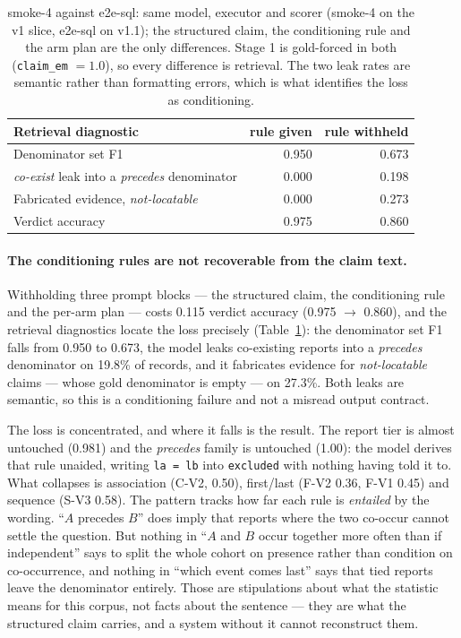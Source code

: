 \begin{table}[t]
\centering
\small
\begin{tabular}{lrr}
\toprule
Retrieval diagnostic & rule given & rule withheld \\
\midrule
Denominator set F1 & 0.950 & 0.673 \\
\emph{co-exist} leak into a \emph{precedes} denominator & 0.000 & 0.198 \\
Fabricated evidence, \emph{not-locatable} & 0.000 & 0.273 \\
\midrule
Verdict accuracy & 0.975 & 0.860 \\
\bottomrule
\end{tabular}
\caption{smoke-4 against e2e-sql: same model, executor and scorer (smoke-4 on the v1 slice, e2e-sql on v1.1); the
structured claim, the conditioning rule and the arm plan are the only
differences. Stage 1 is gold-forced in both (\texttt{claim\_em} $=1.0$), so
every difference is retrieval. The two leak rates are semantic rather than
formatting errors, which is what identifies the loss as conditioning.}
\label{tab:e2econd}
\end{table}

\paragraph{The conditioning rules are not recoverable from the claim text.}
Withholding three prompt blocks --- the structured claim, the conditioning rule
and the per-arm plan --- costs 0.115 verdict accuracy (0.975 $\rightarrow$
0.860), and the retrieval diagnostics locate the loss precisely
(Table~\ref{tab:e2econd}): the denominator set F1 falls from 0.950 to 0.673, the
model leaks co-existing reports into a \emph{precedes} denominator on 19.8\% of
records, and it fabricates evidence for \emph{not-locatable} claims --- whose
gold denominator is empty --- on 27.3\%. Both leaks are semantic, so this is a
conditioning failure and not a misread output contract.

The loss is concentrated, and where it falls is the result. The report tier is
almost untouched (0.981) and the \emph{precedes} family is untouched (1.00): the
model derives that rule unaided, writing \texttt{la = lb} into \texttt{excluded}
with nothing having told it to. What collapses is association (C-V2, 0.50),
first/last (F-V2 0.36, F-V1 0.45) and sequence (S-V3 0.58). The pattern tracks
how far each rule is \emph{entailed} by the wording. ``$A$ precedes $B$'' does
imply that reports where the two co-occur cannot settle the question. But
nothing in ``$A$ and $B$ occur together more often than if independent'' says to
split the whole cohort on presence rather than condition on co-occurrence, and
nothing in ``which event comes last'' says that tied reports leave the
denominator entirely. Those are stipulations about what the statistic means for
this corpus, not facts about the sentence --- they are what the structured claim
carries, and a system without it cannot reconstruct them.

